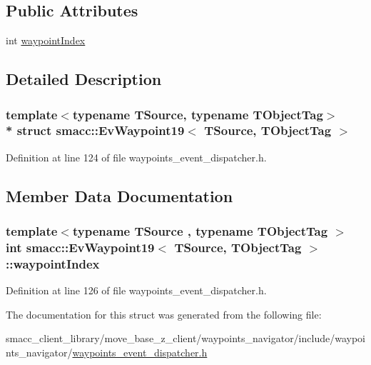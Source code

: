 \subsection*{Public Attributes}
\begin{DoxyCompactItemize}
\item 
int \hyperlink{structsmacc_1_1EvWaypoint19_ae6b196f3c3713c9450f5197657369c69}{waypoint\+Index}
\end{DoxyCompactItemize}


\subsection{Detailed Description}
\subsubsection*{template$<$typename T\+Source, typename T\+Object\+Tag$>$\\*
struct smacc\+::\+Ev\+Waypoint19$<$ T\+Source, T\+Object\+Tag $>$}



Definition at line 124 of file waypoints\+\_\+event\+\_\+dispatcher.\+h.



\subsection{Member Data Documentation}
\subsubsection[{\texorpdfstring{waypoint\+Index}{waypointIndex}}]{\setlength{\rightskip}{0pt plus 5cm}template$<$typename T\+Source , typename T\+Object\+Tag $>$ int {\bf smacc\+::\+Ev\+Waypoint19}$<$ T\+Source, T\+Object\+Tag $>$\+::waypoint\+Index}\hypertarget{structsmacc_1_1EvWaypoint19_ae6b196f3c3713c9450f5197657369c69}{}\label{structsmacc_1_1EvWaypoint19_ae6b196f3c3713c9450f5197657369c69}


Definition at line 126 of file waypoints\+\_\+event\+\_\+dispatcher.\+h.



The documentation for this struct was generated from the following file\+:\begin{DoxyCompactItemize}
\item 
smacc\+\_\+client\+\_\+library/move\+\_\+base\+\_\+z\+\_\+client/waypoints\+\_\+navigator/include/waypoints\+\_\+navigator/\hyperlink{waypoints__event__dispatcher_8h}{waypoints\+\_\+event\+\_\+dispatcher.\+h}\end{DoxyCompactItemize}
